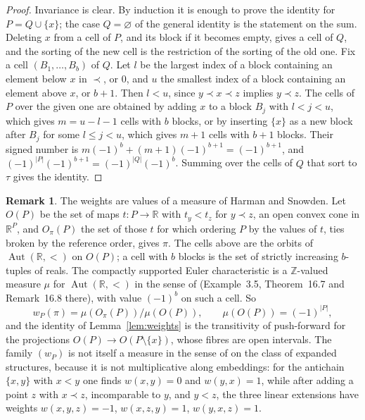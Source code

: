 \documentclass[11pt,a4paper]{article}
\theoremstyle{definition}
\newtheorem{remark}[theorem]{Remark}
\newcommand{\Z}{\mathbb{Z}}
\newcommand{\R}{\mathbb{R}}
\newcommand{\Aut}{\operatorname{Aut}}
\begin{document}
\begin{proof}
Invariance is clear. By induction it is enough to prove the identity for
$P=Q\cup\{x\}$; the case $Q=\varnothing$ of the general identity is the
statement on the sum. Deleting $x$ from a cell of $P$, and its block if it
becomes empty, gives a cell of $Q$, and the sorting of the new cell is the
restriction of the sorting of the old one. Fix a cell $(B_1,\dots,B_b)$ of
$Q$. Let $l$ be the largest index of a block containing an element below
$x$ in $\prec$, or $0$, and $u$ the smallest index of a block containing an
element above $x$, or $b+1$. Then $l<u$, since $y\prec x\prec z$ implies
$y\prec z$. The cells of $P$ over the given one are obtained by adding $x$
to a block $B_j$ with $l<j<u$, which gives $m=u-l-1$ cells with $b$ blocks,
or by inserting $\{x\}$ as a new block after $B_j$ for some $l\le j<u$,
which gives $m+1$ cells with $b+1$ blocks. Their signed number is
$m(-1)^b+(m+1)(-1)^{b+1}=(-1)^{b+1}$, and
$(-1)^{|P|}(-1)^{b+1}=(-1)^{|Q|}(-1)^b$. Summing over the cells of $Q$ that
sort to $\tau$ gives the identity.
\end{proof}

\begin{remark}\label{rem:HS}
The weights are values of a measure of Harman and Snowden. Let $O(P)$ be
the set of maps $t\colon P\to\R$ with $t_y<t_z$ for $y\prec z$, an open
convex cone in $\R^P$, and $O_\pi(P)$ the set of those $t$ for which
ordering $P$ by the values of $t$, ties broken by the reference order,
gives $\pi$. The cells above are the orbits of $\Aut(\R,<)$ on $O(P)$; a
cell with $b$ blocks is the set of strictly increasing $b$-tuples of reals.
The compactly supported Euler characteristic is a $\Z$-valued measure
$\mu$ for $\Aut(\R,<)$ in the sense of \cite{HS} (Example~3.5,
Theorem~16.7 and Remark~16.8 there), with value $(-1)^b$ on such a cell. So
\[
 w_P(\pi)=\mu(O_\pi(P))/\mu(O(P)),\qquad\mu(O(P))=(-1)^{|P|},
\]
and the identity of Lemma~\ref{lem:weights} is the transitivity of
push-forward \cite[Proposition~4.8]{HS} for the projections $O(P)\to O(P\setminus\{x\})$, whose fibres are open intervals. The family
$(w_P)$ is not itself a measure in the sense of \cite{HS} on the class of
expanded structures, because it is not multiplicative along embeddings: for
the antichain $\{x,y\}$ with $x<y$ one finds $w(x,y)=0$ and $w(y,x)=1$,
while after adding a point $z$ with $x\prec z$, incomparable to $y$, and
$y<z$, the three linear extensions have weights $w(x,y,z)=-1$,
$w(x,z,y)=1$, $w(y,x,z)=1$.
\end{remark}
\end{document}
